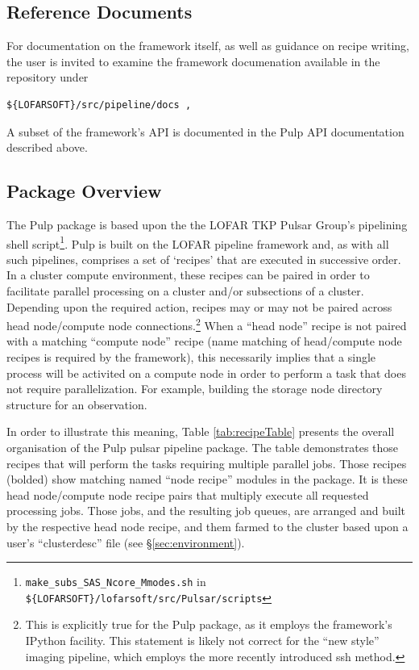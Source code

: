 \documentclass[a4paper,10pt,bibtotoc]{scrartcl}
\begin{document}
\subsection{Reference Documents}
For documentation on the framework itself, as well as guidance on recipe writing,
the user is invited to examine the framework documenation available in the 
repository under
\begin{verbatim}
${LOFARSOFT}/src/pipeline/docs ,
\end{verbatim}
A subset of the framework's API is documented in the Pulp  API
documentation described above.

\subsection{Package Overview}
\label{sec:package}
The Pulp package is based upon the the LOFAR TKP Pulsar Group's pipelining shell 
script\footnote{ \texttt{make\_subs\_SAS\_Ncore\_Mmodes.sh} in
\texttt{ \$\{LOFARSOFT\}/lofarsoft/src/Pulsar/scripts}}.  Pulp is 
built on the LOFAR pipeline framework and, as with all such pipelines, 
comprises a set of `recipes' that are executed in successive order.  
In a cluster compute environment, these recipes can be paired in order 
to facilitate parallel processing on a cluster and/or subsections of a 
cluster. Depending upon the required action, recipes may or may not be 
paired across head node/compute node connections.\footnote{This is
  explicitly true for the Pulp package, as it employs the framework's IPython
  facility.  This statement is likely not correct for the ``new
  style'' imaging pipeline, which employs the more recently introduced
  ssh method.}  When a ``head node'' 
recipe is not paired with a matching ``compute node'' recipe (name
matching of head/compute node recipes is required by the framework),
this necessarily implies that a single process will be activited on a
compute node in order to perform a task that does not require
parallelization. For example, building the storage node directory
structure for an observation.

In order to illustrate this meaning, Table \ref{tab:recipeTable} presents 
the overall organisation of the Pulp pulsar pipeline package.  The table 
demonstrates those recipes that will perform the tasks requiring multiple 
parallel jobs.  Those recipes (bolded) show matching named ``node recipe'' 
modules in the package.  It is these head node/compute node recipe pairs that 
multiply execute all requested processing jobs.  Those jobs, and the resulting 
job queues, are arranged and built by the respective head node recipe, and 
them farmed to the cluster based upon a user's ``clusterdesc'' 
file (see \S \ref{sec:environment}).
\end{document}
